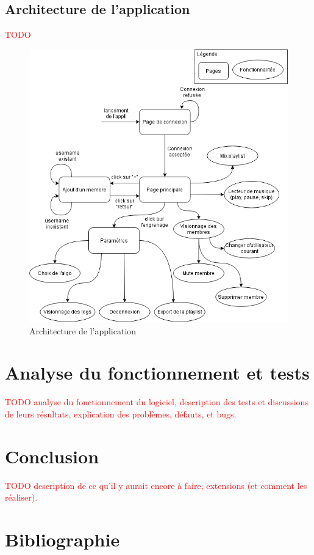 \documentclass{article}
\newcommand\todo[1]{\textcolor{red}{#1}}
\begin{document}
		\subsection{Architecture de l'application}\label{archi_log}
		\todo{TODO}
		\begin{figure}[h!]
			\includegraphics[width=\linewidth]{ressources/Architecture_Log.png}
			\caption{Architecture de l'application}
			\label{fig:class_diag}
		\end{figure}
	
	    \newpage
		\section{Analyse du fonctionnement et tests}
	
    	\todo{TODO analyse du fonctionnement du logiciel, description des tests et discussions de
        leurs résultats, explication des problèmes, défauts, et bugs.}

		\section{Conclusion}
        \todo{TODO description de ce qu’il y aurait encore à faire,
                extensions (et comment les réaliser).}
			
		\section{Bibliographie}
		
						
								
\end{document}
